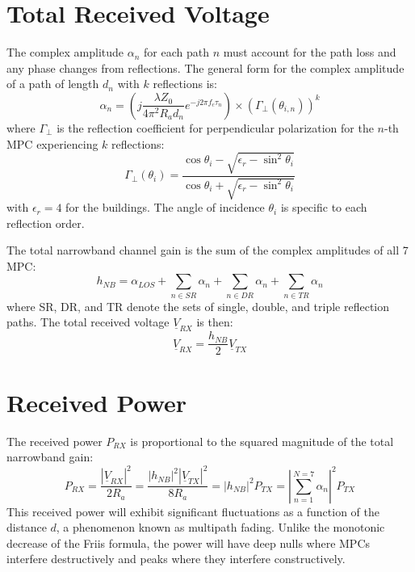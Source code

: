 \section{Total Received Voltage}
The complex amplitude $\alpha_n$ for each path $n$ must account for the path loss and any phase changes from reflections. The general form for the complex amplitude of a path of length $d_n$ with $k$ reflections is:
\begin{equation}
	\alpha_n = \left( j \frac{\lambda Z_0}{4\pi^2 R_a d_n} e^{-j2\pi f_c \tau_n} \right) \times (\Gamma_{\perp}(\theta_{i,n}))^k
\end{equation}
where $\Gamma_{\perp}$ is the reflection coefficient for perpendicular polarization for the $n$-th MPC experiencing $k$ reflections:
\begin{equation}
	\Gamma_{\perp}(\theta_i) = \frac{\cos\theta_i - \sqrt{\epsilon_r - \sin^2\theta_i}}{\cos\theta_i + \sqrt{\epsilon_r - \sin^2\theta_i}}
\end{equation}
with $\epsilon_r = 4$ for the buildings. The angle of incidence $\theta_i$ is specific to each reflection order.

The total narrowband channel gain is the sum of the complex amplitudes of all 7 MPC:
\begin{equation}
	h_{NB} = \alpha_{LOS} + \sum_{n \in SR} \alpha_n + \sum_{n \in DR} \alpha_n + \sum_{n \in TR} \alpha_n
\end{equation}
where SR, DR, and TR denote the sets of single, double, and triple reflection paths. The total received voltage $\underline{V}_{RX}$ is then:
\begin{equation}
	\underline{V}_{RX} = \frac{h_{NB}}{2} \underline{V}_{TX}
\end{equation}

\section{Received Power}
The received power $P_{RX}$ is proportional to the squared magnitude of the total narrowband gain:
\begin{equation}
	P_{RX} = \frac{|\underline{V}_{RX}|^2}{2R_a} = \frac{|h_{NB}|^2 |\underline{V}_{TX}|^2}{8R_a} = |h_{NB}|^2 P_{TX} = \left| \sum_{n=1}^{N=7} \alpha_n \right|^2 P_{TX}
\end{equation}
This received power will exhibit significant fluctuations as a function of the distance $d$, a phenomenon known as multipath fading. Unlike the monotonic decrease of the Friis formula, the power will have deep nulls where MPCs interfere destructively and peaks where they interfere constructively.

